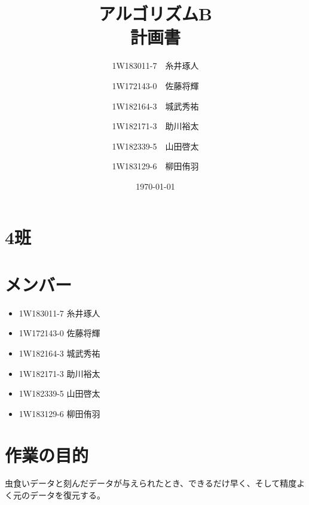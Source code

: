 \documentclass[uplatex]{jsarticle}
\title{アルゴリズムB\\計画書}
\author{1W183011-7　糸井琢人\and 1W172143-0　佐藤将輝\and 1W182164-3　城武秀祐\and 1W182171-3　助川裕太\and 1W182339-5　山田啓太\and 1W183129-6　柳田侑羽}
\date{\today}
\begin{document}
    \maketitle
    \section{4班}

    \section{メンバー}
    \begin{itemize}
        \item 1W183011-7 糸井琢人
        \item 1W172143-0 佐藤将輝
        \item 1W182164-3 城武秀祐
        \item 1W182171-3 助川裕太
        \item 1W182339-5 山田啓太
        \item 1W183129-6 柳田侑羽
    \end{itemize}

    \section{作業の目的}
    虫食いデータと刻んだデータが与えられたとき、できるだけ早く、そして精度よく元のデータを復元する。
\end{document}
